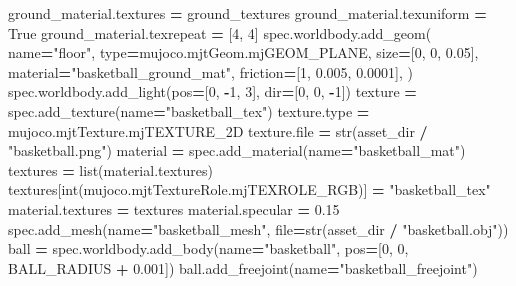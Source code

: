 \documentclass[
  american,
  11pt,
  letterpaper,
]{article}
\newenvironment{Shaded}{\begin{snugshade}}{\end{snugshade}}
\newcommand{\BuiltInTok}[1]{#1}
\newcommand{\DecValTok}[1]{\textcolor[rgb]{0.00,0.00,0.81}{#1}}
\newcommand{\FloatTok}[1]{\textcolor[rgb]{0.00,0.00,0.81}{#1}}
\newcommand{\NormalTok}[1]{#1}
\newcommand{\OperatorTok}[1]{\textcolor[rgb]{0.81,0.36,0.00}{\textbf{#1}}}
\newcommand{\StringTok}[1]{\textcolor[rgb]{0.31,0.60,0.02}{#1}}
\newcommand{\VariableTok}[1]{\textcolor[rgb]{0.00,0.00,0.00}{#1}}
\renewenvironment{Shaded}{\par\smallskip}{\par\smallskip}
\begin{document}
\begin{Shaded}
\begin{Highlighting}[]
\NormalTok{    ground\_material.textures }\OperatorTok{=}\NormalTok{ ground\_textures}
\NormalTok{    ground\_material.texuniform }\OperatorTok{=} \VariableTok{True}
\NormalTok{    ground\_material.texrepeat }\OperatorTok{=}\NormalTok{ [}\DecValTok{4}\NormalTok{, }\DecValTok{4}\NormalTok{]}
\NormalTok{    spec.worldbody.add\_geom(}
\NormalTok{        name}\OperatorTok{=}\StringTok{"floor"}\NormalTok{, }\BuiltInTok{type}\OperatorTok{=}\NormalTok{mujoco.mjtGeom.mjGEOM\_PLANE,}
\NormalTok{        size}\OperatorTok{=}\NormalTok{[}\DecValTok{0}\NormalTok{, }\DecValTok{0}\NormalTok{, }\FloatTok{0.05}\NormalTok{], material}\OperatorTok{=}\StringTok{"basketball\_ground\_mat"}\NormalTok{,}
\NormalTok{        friction}\OperatorTok{=}\NormalTok{[}\DecValTok{1}\NormalTok{, }\FloatTok{0.005}\NormalTok{, }\FloatTok{0.0001}\NormalTok{],}
\NormalTok{    )}
\NormalTok{    spec.worldbody.add\_light(pos}\OperatorTok{=}\NormalTok{[}\DecValTok{0}\NormalTok{, }\OperatorTok{{-}}\DecValTok{1}\NormalTok{, }\DecValTok{3}\NormalTok{], }\BuiltInTok{dir}\OperatorTok{=}\NormalTok{[}\DecValTok{0}\NormalTok{, }\DecValTok{0}\NormalTok{, }\OperatorTok{{-}}\DecValTok{1}\NormalTok{])}
\NormalTok{    texture }\OperatorTok{=}\NormalTok{ spec.add\_texture(name}\OperatorTok{=}\StringTok{"basketball\_tex"}\NormalTok{)}
\NormalTok{    texture.}\BuiltInTok{type} \OperatorTok{=}\NormalTok{ mujoco.mjtTexture.mjTEXTURE\_2D}
\NormalTok{    texture.}\BuiltInTok{file} \OperatorTok{=} \BuiltInTok{str}\NormalTok{(asset\_dir }\OperatorTok{/} \StringTok{"basketball.png"}\NormalTok{)}
\NormalTok{    material }\OperatorTok{=}\NormalTok{ spec.add\_material(name}\OperatorTok{=}\StringTok{"basketball\_mat"}\NormalTok{)}
\NormalTok{    textures }\OperatorTok{=} \BuiltInTok{list}\NormalTok{(material.textures)}
\NormalTok{    textures[}\BuiltInTok{int}\NormalTok{(mujoco.mjtTextureRole.mjTEXROLE\_RGB)] }\OperatorTok{=} \StringTok{"basketball\_tex"}
\NormalTok{    material.textures }\OperatorTok{=}\NormalTok{ textures}
\NormalTok{    material.specular }\OperatorTok{=} \FloatTok{0.15}
\NormalTok{    spec.add\_mesh(name}\OperatorTok{=}\StringTok{"basketball\_mesh"}\NormalTok{, }\BuiltInTok{file}\OperatorTok{=}\BuiltInTok{str}\NormalTok{(asset\_dir }\OperatorTok{/} \StringTok{"basketball.obj"}\NormalTok{))}
\NormalTok{    ball }\OperatorTok{=}\NormalTok{ spec.worldbody.add\_body(name}\OperatorTok{=}\StringTok{"basketball"}\NormalTok{, pos}\OperatorTok{=}\NormalTok{[}\DecValTok{0}\NormalTok{, }\DecValTok{0}\NormalTok{, BALL\_RADIUS }\OperatorTok{+} \FloatTok{0.001}\NormalTok{])}
\NormalTok{    ball.add\_freejoint(name}\OperatorTok{=}\StringTok{"basketball\_freejoint"}\NormalTok{)}

\end{Highlighting}
\end{Shaded}
\end{document}
